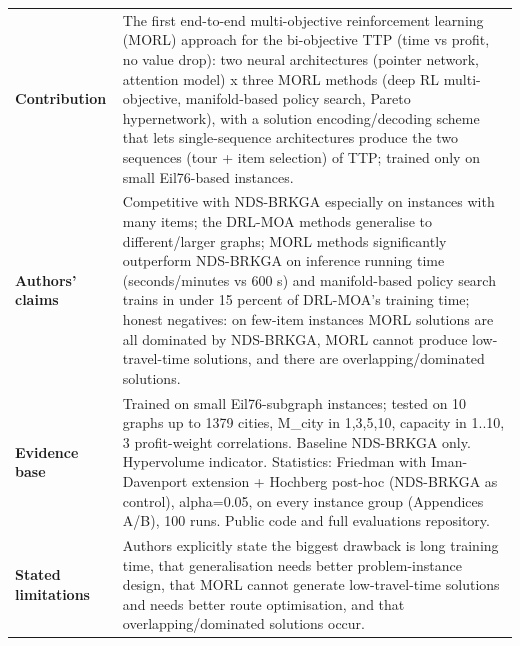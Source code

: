 \documentclass[
  a4paper,
  11pt,
  headings=small,
  numbers=noenddot,
  abstract=on,
  parskip=half,
]{scrartcl}
\begin{document}
\begin{landscape}
\begin{longtable}{@{}p{2.6cm}p{8.7cm}p{2.6cm}p{8.7cm}@{}}
\textbf{Contribution} & \multicolumn{3}{p{20.0cm}}{The first end-to-end multi-objective reinforcement learning (MORL) approach for the bi-objective TTP (time vs profit, no value drop): two neural architectures (pointer network, attention model) x three MORL methods (deep RL multi-objective, manifold-based policy search, Pareto hypernetwork), with a solution encoding/decoding scheme that lets single-sequence architectures produce the two sequences (tour + item selection) of TTP; trained only on small Eil76-based instances.} \\
\textbf{Authors' claims} & \multicolumn{3}{p{20.0cm}}{Competitive with NDS-BRKGA especially on instances with many items; the DRL-MOA methods generalise to different/larger graphs; MORL methods significantly outperform NDS-BRKGA on inference running time (seconds/minutes vs 600 s) and manifold-based policy search trains in under 15 percent of DRL-MOA's training time; honest negatives: on few-item instances MORL solutions are all dominated by NDS-BRKGA, MORL cannot produce low-travel-time solutions, and there are overlapping/dominated solutions.} \\
\textbf{Evidence base} & \multicolumn{3}{p{20.0cm}}{Trained on small Eil76-subgraph instances; tested on 10 graphs up to 1379 cities, M\_city in {1,3,5,10}, capacity in {1..10}, 3 profit-weight correlations. Baseline NDS-BRKGA only. Hypervolume indicator. Statistics: Friedman with Iman-Davenport extension + Hochberg post-hoc (NDS-BRKGA as control), alpha=0.05, on every instance group (Appendices A/B), 100 runs. Public code and full evaluations repository.} \\
\textbf{Stated limitations} & \multicolumn{3}{p{20.0cm}}{Authors explicitly state the biggest drawback is long training time, that generalisation needs better problem-instance design, that MORL cannot generate low-travel-time solutions and needs better route optimisation, and that overlapping/dominated solutions occur.} \\

\end{longtable}
\end{landscape}
\end{document}

